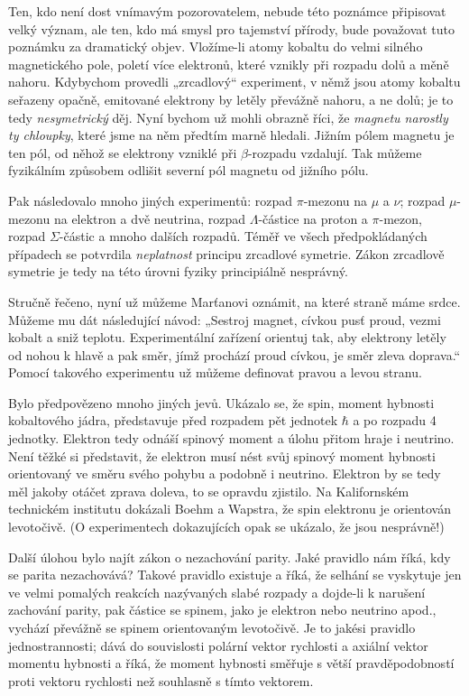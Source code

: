     Ten, kdo není dost vnímavým pozorovatelem, nebude této poznámce připisovat velký význam, ale
    ten, kdo má smysl pro tajemství přírody, bude považovat tuto poznámku za dramatický objev.
    Vložíme-li atomy kobaltu do velmi silného magnetického pole, poletí více elektronů, které
    vznikly při rozpadu dolů a měně nahoru. Kdybychom provedli „zrcadlový“ experiment, v němž jsou
    atomy kobaltu seřazeny opačně, emitované elektrony by letěly převážně nahoru, a ne dolů; je to
    tedy \emph{nesymetrický} děj. Nyní bychom už mohli obrazně říci, že \emph{magnetu narostly ty
    chloupky}, které jsme na něm předtím marně hledali. Jižním pólem magnetu je ten pól, od něhož se
    elektrony vzniklé při \(\beta\)-rozpadu vzdalují. Tak můžeme fyzikálním způsobem odlišit severní
    pól magnetu od jižního pólu.

    Pak následovalo mnoho jiných experimentů: rozpad \(\pi\)-mezonu na \(\mu\) a \(\nu\); rozpad
    \(\mu\)-mezonu na elektron a dvě neutrina, rozpad \(\Lambda\)-částice na proton a \(\pi\)-mezon,
    rozpad \(\Sigma\)-částic a mnoho dalších rozpadů. Téměř ve všech předpokládaných případech se
    potvrdila \emph{neplatnost} principu zrcadlové symetrie. Zákon zrcadlově symetrie je tedy na
    této úrovni fyziky principiálně nesprávný.

    Stručně řečeno, nyní už můžeme Marťanovi oznámit, na které straně máme srdce. Můžeme
    mu dát následující návod: „Sestroj magnet, cívkou pusť proud, vezmi kobalt a sniž teplotu.
    Experimentální zařízení orientuj tak, aby elektrony letěly od nohou k hlavě a pak směr, jímž
    prochází proud cívkou, je směr zleva doprava.“ Pomocí takového experimentu už můžeme definovat
    pravou a levou stranu.

    Bylo předpovězeno mnoho jiných jevů. Ukázalo se, že spin, moment hybnosti kobaltového jádra,
    představuje před rozpadem pět jednotek \(\hbar\) a po rozpadu 4 jednotky. Elektron tedy odnáší
    spinový moment a úlohu přitom hraje i neutrino. Není těžké si představit, že elektron musí nést
    svůj spinový moment hybnosti orientovaný ve směru svého pohybu a podobně i neutrino. Elektron by
    se tedy měl jakoby otáčet zprava doleva, to se opravdu zjistilo. Na Kalifornském technickém
    institutu dokázali Boehm a Wapstra, že spin elektronu je orientován levotočivě. (O experimentech
    dokazujících opak se ukázalo, že jsou nesprávně!)

    Další úlohou bylo najít zákon o nezachování parity. Jaké pravidlo nám říká, kdy se parita
    nezachovává? Takové pravidlo existuje a říká, že selhání se vyskytuje jen ve velmi pomalých
    reakcích nazývaných slabé rozpady a dojde-li k narušení zachování parity, pak částice se spinem,
    jako je elektron nebo neutrino apod., vychází převážně se spinem orientovaným levotočivě. Je to
    jakési pravidlo jednostrannosti; dává do souvislosti polární vektor rychlosti a axiální vektor
    momentu hybnosti a říká, že moment hybnosti směřuje s větší pravděpodobností proti vektoru
    rychlosti než souhlasně s tímto vektorem.

